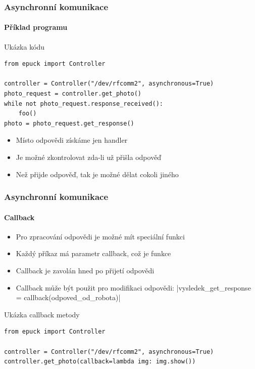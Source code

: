 \documentclass{beamer}
\begin{document}
\begin{frame}[fragile]
    \frametitle{Asynchronní komunikace}
    \framesubtitle{Příklad programu}
    \begin{exampleblock}{Ukázka kódu}
    \begin{verbatim}
from epuck import Controller

controller = Controller("/dev/rfcomm2", asynchronous=True)
photo_request = controller.get_photo()
while not photo_request.response_received():
    foo()
photo = photo_request.get_response()
    \end{verbatim}
    \end{exampleblock}

    \begin{itemize}
        \item Místo odpovědi získáme jen handler
        \item Je možné zkontrolovat zda-li už přišla odpověď
        \item Než přijde odpověď, tak je možné dělat cokoli jiného
    \end{itemize}
\end{frame}

\begin{frame}[fragile]
    \frametitle{Asynchronní komunikace}
    \framesubtitle{Callback}
    \begin{itemize}
        \item Pro zpracování odpovědi je možné mít speciální funkci
        \item Každý příkaz má parametr callback, což je funkce
        \item Callback je zavolán hned po přijetí odpovědi
        \item Callback může být použit pro modifikaci odpovědi:
        |vysledek_get_response = callback(odpoved_od_robota)|
    \end{itemize}
    \begin{exampleblock}{Ukázka callback metody}
    \begin{verbatim}
from epuck import Controller

controller = Controller("/dev/rfcomm2", asynchronous=True)
controller.get_photo(callback=lambda img: img.show())
    \end{verbatim}
    \end{exampleblock}

\end{frame}
\end{document}
